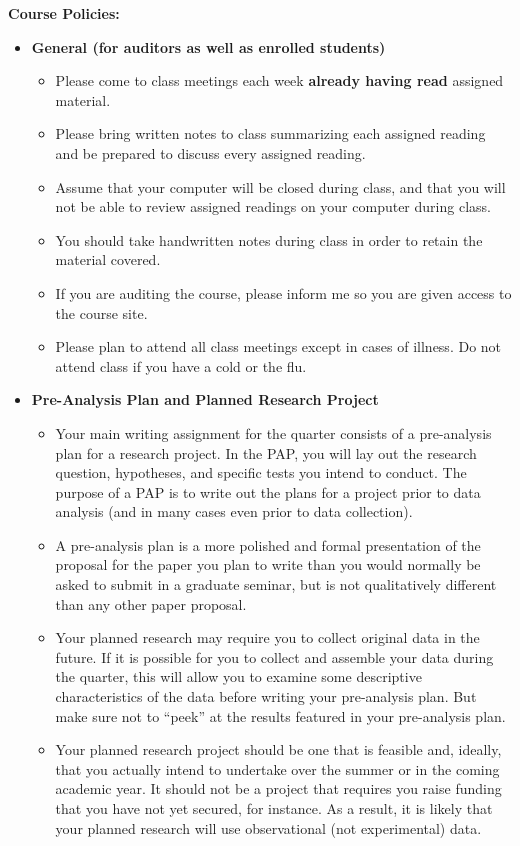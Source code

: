 \documentclass[11pt]{article}
\begin{document}
\textbf {\large Course Policies:}
\begin{itemize}
	\item \textbf {General (for auditors as well as enrolled students)}
		\begin{itemize}
			\item Please come to class meetings each week \textbf{already having read} assigned material.
			\item Please bring written notes to class summarizing each assigned reading and be prepared to discuss every assigned reading. 
			\item Assume that your computer will be closed during class, and that you will not be able to review assigned
			readings on your computer during class. 
			\item You should take handwritten notes during class in order to retain the material covered. 
			\item If you are auditing the course, please inform me so you are given access to the course site. 
			\item Please plan to attend all class meetings except in cases of illness. Do not attend class if you have a cold or the flu. 
		\end{itemize}
		\item \textbf{Pre-Analysis Plan and Planned Research Project}
		\begin{itemize}
		\item Your main writing assignment for the quarter consists of a pre-analysis plan for a research project. In the PAP, you will lay out the research question, hypotheses, and  specific tests you intend to conduct. The purpose of a PAP is to write out
		the plans for a project prior to data analysis (and in many cases even prior to data collection).
		\item A pre-analysis plan is a more polished and formal presentation of the proposal for the paper you plan to write than you would normally be asked to submit in a graduate seminar, but is not qualitatively different than any other paper proposal. 
		\item Your planned research may require you to collect original data in the future. If it is possible for you to collect and assemble your data during the quarter, this will allow you to examine some descriptive characteristics of the data before writing your pre-analysis plan. But make sure not to ``peek'' at the results featured in your pre-analysis plan.  
		\item Your planned research project should be one that is feasible and, ideally, that you actually intend to undertake over the summer or in the coming academic year. It should not be a project that requires you raise funding that you have not yet secured, for instance. As a result, it is likely that your planned research will use observational (not experimental) data.

\end{itemize}
\end{itemize}
\end{document}
